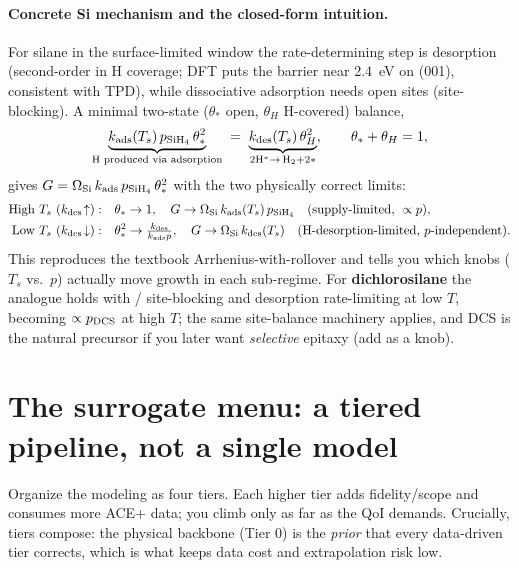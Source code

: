 \documentclass[11pt]{article}
\begin{document}
\paragraph{Concrete Si mechanism and the closed-form intuition.} For silane in the surface-limited window the rate-determining step is  desorption (second-order in H coverage; DFT puts the barrier near \SI{2.4}{eV} on (001), consistent with TPD), while  dissociative adsorption needs open sites (site-blocking). A minimal two-state ($\theta_*$ open, $\theta_H$ H-covered) balance,
\begin{equation}
\underbrace{k_{\text{ads}}(T_s)\,p_{\ce{SiH4}}\,\theta_*^2}_{\text{H produced via adsorption}} \;=\; \underbrace{k_{\text{des}}(T_s)\,\theta_H^2}_{2\mathrm{H}^\ast \to\, \mathrm{H}_2 + 2\ast},
\qquad \theta_*+\theta_H=1,
\end{equation}
gives $G=\Omega_{\mathrm{Si}}\,k_{\text{ads}}\,p_{\ce{SiH4}}\,\theta_*^2$ with the two physically correct limits:
\begin{align}
\text{High }T_s\ (k_{\text{des}}\!\uparrow):&\quad \theta_*\to 1,\quad G\to \Omega_{\mathrm{Si}}\,k_{\text{ads}}(T_s)\,p_{\ce{SiH4}}\quad(\text{supply-limited, }\propto p),\\
\text{Low }T_s\ (k_{\text{des}}\!\downarrow):&\quad \theta_*^2\to \tfrac{k_{\text{des}}}{k_{\text{ads}}p},\quad G\to \Omega_{\mathrm{Si}}\,k_{\text{des}}(T_s)\quad(\text{H-desorption-limited, }p\text{-independent}).
\end{align}
This reproduces the textbook Arrhenius-with-rollover and tells you which knobs ($T_s$ vs.\ $p$) actually move growth in each sub-regime. For \textbf{dichlorosilane} the analogue holds with / site-blocking and  desorption rate-limiting at low $T$, becoming $\propto p_{\ce{DCS}}$ at high $T$; the same site-balance machinery applies, and DCS is the natural precursor if you later want \emph{selective} epitaxy (add  as a knob).

\section{The surrogate menu: a tiered pipeline, not a single model}
\label{sec:menu}

Organize the modeling as four tiers. Each higher tier adds fidelity/scope and consumes more ACE+ data; you climb only as far as the QoI demands. Crucially, tiers compose: the physical backbone (Tier 0) is the \emph{prior} that every data-driven tier corrects, which is what keeps data cost and extrapolation risk low.
\end{document}
